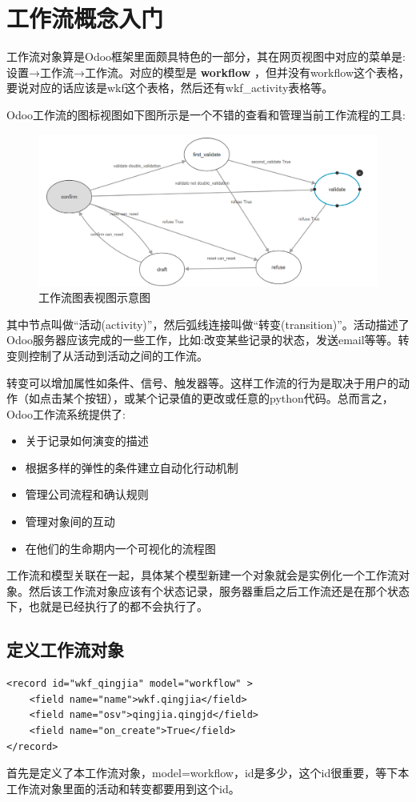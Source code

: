 \documentclass[11pt,a4paper]{sphinxmanual}
\begin{document}
\section{工作流概念入门}
\label{sec-10-2}
工作流对象算是Odoo框架里面颇具特色的一部分，其在网页视图中对应的菜单是: 设置→工作流→工作流。对应的模型是 \textbf{workflow} ，但并没有workflow这个表格，要说对应的话应该是wkf这个表格，然后还有wkf\_activity表格等。

Odoo工作流的图标视图如下图所示是一个不错的查看和管理当前工作流程的工具:

\begin{figure}[H]
\centering
\includegraphics[keepaspectratio,max width=0.95\linewidth]{images/工作流图表视图.png}
\caption{工作流图表视图示意图}
\end{figure}

其中节点叫做“活动(activity)”，然后弧线连接叫做“转变(transition)”。活动描述了Odoo服务器应该完成的一些工作，比如:改变某些记录的状态，发送email等等。转变则控制了从活动到活动之间的工作流。

转变可以增加属性如条件、信号、触发器等。这样工作流的行为是取决于用户的动作（如点击某个按钮），或某个记录值的更改或任意的python代码。总而言之，Odoo工作流系统提供了:

\begin{itemize}
\item 关于记录如何演变的描述
\item 根据多样的弹性的条件建立自动化行动机制
\item 管理公司流程和确认规则
\item 管理对象间的互动
\item 在他们的生命期内一个可视化的流程图
\end{itemize}

工作流和模型关联在一起，具体某个模型新建一个对象就会是实例化一个工作流对象。然后该工作流对象应该有个状态记录，服务器重启之后工作流还是在那个状态下，也就是已经执行了的都不会执行了。


\subsection{定义工作流对象}
\label{sec-10-2-1}
\begin{Verbatim}
<record id="wkf_qingjia" model="workflow" >
    <field name="name">wkf.qingjia</field>
    <field name="osv">qingjia.qingjd</field>
    <field name="on_create">True</field>
</record>
\end{Verbatim}
首先是定义了本工作流对象，model=workflow，id是多少，这个id很重要，等下本工作流对象里面的活动和转变都要用到这个id。
\end{document}
